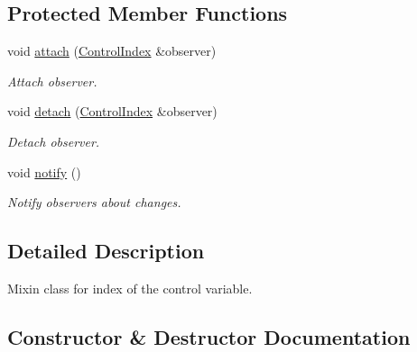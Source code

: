 \subsection*{Protected Member Functions}
\begin{DoxyCompactItemize}
\item 
\hypertarget{classSpacy_1_1Mixin_1_1MixinConnection_abb5520ee6b22dd993d78f142939a1ed4}{}void \hyperlink{classSpacy_1_1Mixin_1_1MixinConnection_abb5520ee6b22dd993d78f142939a1ed4}{attach} (\hyperlink{classSpacy_1_1Mixin_1_1ControlIndex}{Control\+Index} \&observer)\label{classSpacy_1_1Mixin_1_1MixinConnection_abb5520ee6b22dd993d78f142939a1ed4}

\begin{DoxyCompactList}\small\item\em Attach observer. \end{DoxyCompactList}\item 
\hypertarget{classSpacy_1_1Mixin_1_1MixinConnection_adda739590c487679c26f60e50aedb73f}{}void \hyperlink{classSpacy_1_1Mixin_1_1MixinConnection_adda739590c487679c26f60e50aedb73f}{detach} (\hyperlink{classSpacy_1_1Mixin_1_1ControlIndex}{Control\+Index} \&observer)\label{classSpacy_1_1Mixin_1_1MixinConnection_adda739590c487679c26f60e50aedb73f}

\begin{DoxyCompactList}\small\item\em Detach observer. \end{DoxyCompactList}\item 
\hypertarget{classSpacy_1_1Mixin_1_1MixinConnection_a1ddeaa78a3bb4a38c2cca36d1f99fe36}{}void \hyperlink{classSpacy_1_1Mixin_1_1MixinConnection_a1ddeaa78a3bb4a38c2cca36d1f99fe36}{notify} ()\label{classSpacy_1_1Mixin_1_1MixinConnection_a1ddeaa78a3bb4a38c2cca36d1f99fe36}

\begin{DoxyCompactList}\small\item\em Notify observers about changes. \end{DoxyCompactList}\end{DoxyCompactItemize}


\subsection{Detailed Description}
Mixin class for index of the control variable. 

\subsection{Constructor \& Destructor Documentation}
\hypertarget{classSpacy_1_1Mixin_1_1ControlIndex_afa09ff1cc2b7476e8b6e7e26e71cd775_afa09ff1cc2b7476e8b6e7e26e71cd775}{}
